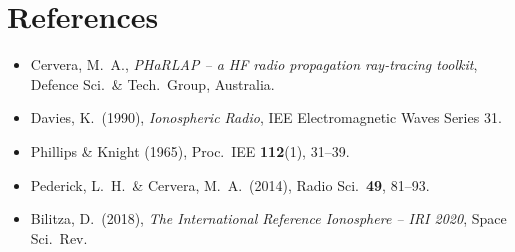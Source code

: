 \documentclass[11pt]{article}
\begin{document}
\section*{References}

\begin{itemize}
\item Cervera, M.~A., \textit{PHaRLAP -- a HF radio propagation
  ray-tracing toolkit}, Defence Sci.\ \& Tech.\ Group, Australia.
\item Davies, K.\ (1990), \textit{Ionospheric Radio}, IEE
  Electromagnetic Waves Series 31.
\item Phillips \& Knight (1965), Proc.\ IEE \textbf{112}(1), 31--39.
\item Pederick, L.~H.\ \& Cervera, M.~A.\ (2014), Radio Sci.\
  \textbf{49}, 81--93.
\item Bilitza, D.\ (2018), \textit{The International Reference
  Ionosphere -- IRI 2020}, Space Sci.\ Rev.
\end{itemize}
\end{document}
